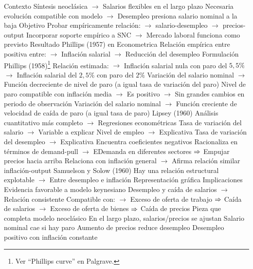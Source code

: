 \documentclass{nuevotema}
\begin{document}
\begin{esquemal}
				\4 Contexto
				\4[] Síntesis neoclásica
				\4[] $\to$ Salarios flexibles en el largo plazo
				\4[] Necesaria evolución compatible con modelo
				\4[] $\to$ Desempleo presiona salario nominal a la baja
				\4 Objetivo
				\4[] Probar empíricamente relación:
				\4[] $\to$ salario-desempleo
				\4[] $\to$ precios-output
				\4[] Incorporar soporte empírico a SNC
				\4[] $\to$ Mercado laboral funciona como previsto
				\4 Resultado
				\4[] Phillips (1957) en Econometrica
				\4[] Relación empírica entre positiva entre:
				\4[] $\to$ Inflación salarial
				\4[] $\to$ Reducción del desempleo
			\3 Formulación
				\4 Phillips (1958)\footnote{Ver ``Phillips curve'' en Palgrave.}
				\4[] 
				\4[] Relación estimada:
				\4[] $\to$ Inflación salarial nula con paro del $5,5\%$
				\4[] $\to$ Inflación salarial del $2,5\%$ con paro del $2\%$
				\4[] Variación del salario nominal
				\4[] $\to$ Función decreciente de nivel de paro
				\4[] (a igual tasa de variación del paro)
				\4[] Nivel de paro compatible con inflación media
				\4[] $\to$ Es positivo
				\4[] $\to$ Sin grandes cambios en periodo de observación
				\4[] Variación del salario nominal
				\4[] $\to$ Función creciente de velocidad de caída de paro
				\4[] (a igual tasa de paro)
				\4 Lipsey (1960)
				\4[] Análisis cuantitativo más completo
				\4[] $\to$ Regresiones econométricas
				\4[] Tasa de variación del salario
				\4[] $\to$ Variable a explicar
				\4[] Nivel de empleo
				\4[] $\to$ Explicativa
				\4[] Tasa de variación del desempleo
				\4[] $\to$ Explicativa
				\4[] Encuentra coeficientes negativos
				\4[] Racionaliza en términos de demand-pull
				\4[] $\to$ EDemanda en diferentes sectores
				\4[] $\Rightarrow$ Empujar precios hacia arriba
				\4[] Relaciona con inflación general
				\4[] $\to$ Afirma relación similar inflación-output
				\4 Samuelson y Solow (1960)
				\4[] Hay una relación estructural explotable
				\4[] $\to$ Entre desempleo e inflación
				\4 Representación gráfica
				\4[] 
			\3 Implicaciones
				\4 Evidencia favorable a modelo keynesiano
				\4[] Desempleo y caída de salarios
				\4[] $\to$ Relación consistente
				\4[] Compatible con:
				\4[] $\to$ Exceso de oferta de trabajo
				\4[] $\Rightarrow$ Caída de salarios
				\4[] $\to$ Exceso de oferta de bienes
				\4[] $\Rightarrow$ Caída de precios
				\4 Pieza que completa modelo neoclásico
				\4[] En el largo plazo, salarios/precios se ajustan
				\4[] Salario nominal cae si hay paro
				\4[] Aumento de precios reduce desempleo
				\4 Desempleo positivo con inflación constante

\end{esquemal}
\end{document}
